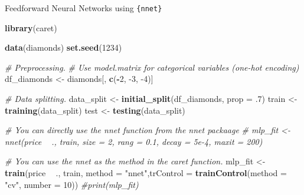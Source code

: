 \documentclass[12pt,ignorenonframetext,]{beamer}
\newenvironment{Shaded}{\begin{snugshade}}{\end{snugshade}}
\newcommand{\CommentTok}[1]{\textcolor[rgb]{0.56,0.35,0.01}{\textit{#1}}}
\newcommand{\DataTypeTok}[1]{\textcolor[rgb]{0.13,0.29,0.53}{#1}}
\newcommand{\DecValTok}[1]{\textcolor[rgb]{0.00,0.00,0.81}{#1}}
\newcommand{\FloatTok}[1]{\textcolor[rgb]{0.00,0.00,0.81}{#1}}
\newcommand{\KeywordTok}[1]{\textcolor[rgb]{0.13,0.29,0.53}{\textbf{#1}}}
\newcommand{\NormalTok}[1]{#1}
\newcommand{\OperatorTok}[1]{\textcolor[rgb]{0.81,0.36,0.00}{\textbf{#1}}}
\newcommand{\StringTok}[1]{\textcolor[rgb]{0.31,0.60,0.02}{#1}}
\begin{document}
\begin{frame}[fragile]{Feedforward Neural Networks using
\texttt{\{nnet\}}}
\protect\hypertarget{feedforward-neural-networks-using}{}

\tiny

\begin{Shaded}
\begin{Highlighting}[]
\KeywordTok{library}\NormalTok{(caret)}

\KeywordTok{data}\NormalTok{(diamonds)}
\KeywordTok{set.seed}\NormalTok{(}\DecValTok{1234}\NormalTok{)}

\CommentTok{# Preprocessing.}
\CommentTok{# Use model.matrix for categorical variables (one-hot encoding)}
\NormalTok{df_diamonds <-}\StringTok{ }\NormalTok{diamonds[, }\KeywordTok{c}\NormalTok{(}\OperatorTok{-}\DecValTok{2}\NormalTok{, }\DecValTok{-3}\NormalTok{, }\DecValTok{-4}\NormalTok{)]}

\CommentTok{# Data splitting.}
\NormalTok{data_split <-}\StringTok{ }\KeywordTok{initial_split}\NormalTok{(df_diamonds, }\DataTypeTok{prop =} \FloatTok{.7}\NormalTok{)}
\NormalTok{train <-}\StringTok{ }\KeywordTok{training}\NormalTok{(data_split)}
\NormalTok{test  <-}\StringTok{ }\KeywordTok{testing}\NormalTok{(data_split)}

\CommentTok{# You can directly use the nnet function from the nnet packaage}
\CommentTok{# mlp_fit <- nnet(price ~ ., train, size = 2, rang = 0.1, decay = 5e-4, maxit = 200)}

\CommentTok{# You can use the nnet as the method in the caret function.}
\NormalTok{mlp_fit <-}\StringTok{ }\KeywordTok{train}\NormalTok{(price }\OperatorTok{~}\StringTok{ }\NormalTok{., train, }\DataTypeTok{method =} \StringTok{"nnet"}\NormalTok{,}\DataTypeTok{trControl =} \KeywordTok{trainControl}\NormalTok{(}\DataTypeTok{method =} \StringTok{"cv"}\NormalTok{,}
                                        \DataTypeTok{number =} \DecValTok{10}\NormalTok{))}
\CommentTok{#print(mlp_fit)}
\end{Highlighting}
\end{Shaded}

\normalsize

\end{frame}
\end{document}
